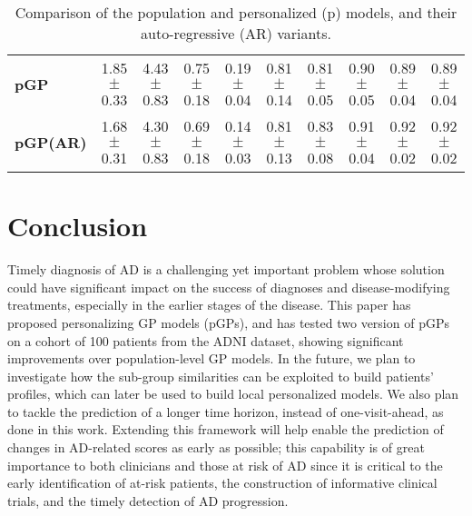 \documentclass{article}
\begin{document}
\begin{table}
\begin{adjustbox}{width=1\textwidth}
\begin{tabular}{l|cccc|cccc|c}
\textbf{pGP} &1.85$\pm$0.33	&4.43$\pm$0.83	&0.75$\pm$0.18 &0.19$\pm$0.04
             &0.81$\pm$0.14 &0.81$\pm$0.05  &0.90$\pm$0.05 &0.89$\pm$0.04 &0.89$\pm$0.04\\

\textbf{pGP(AR)}  &1.68$\pm$0.31	&4.30$\pm$0.83	&0.69$\pm$0.18 &0.14$\pm$0.03
                  &0.81$\pm$0.13    &0.83$\pm$0.08  &0.91$\pm$0.04 &0.92$\pm$0.02 &0.92$\pm$0.02\\
\bottomrule    
\end{tabular}
\end{adjustbox}
\caption{\small  Comparison of the population and personalized (p) models, and their auto-regressive (AR) variants.}
\label{tab_res}
\vspace*{-0.7cm}
\end{table}


\section{Conclusion}
\label{headings}
Timely diagnosis of AD is a challenging yet important problem whose solution could have significant impact on the success of diagnoses and disease-modifying treatments, especially in the earlier stages of the disease. This paper has proposed personalizing GP models (pGPs), and has tested two version of pGPs on a cohort of 100 patients from the ADNI dataset, showing significant improvements over population-level GP models. In the future, we plan to investigate how the sub-group similarities can be exploited to build patients' profiles, which can later be used to build local personalized models. We also plan to tackle the prediction of a longer time horizon, instead of one-visit-ahead, as done in this work. Extending this framework will help enable the prediction of changes in AD-related scores as early as possible; this capability is of great importance to both clinicians and those at risk of AD since it is critical to the early identification of at-risk patients, the construction of informative clinical trials, and the timely detection of AD progression.
\end{document}

